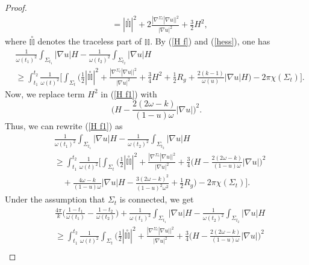 \documentclass[12pt]{article}
\theoremstyle{definition}
\theoremstyle{plain}
\numberwithin{equation}{section}
\begin{document}
\begin{proof}
\begin{equation}
\begin{aligned}
&=|\overset{\circ}{\mathbb{II}}|^{2}+2\frac{|\nabla^{\Sigma_{t}}|\nabla u||^{2}}{|\nabla u|^{2}}+\frac{3}{2}H^{2},
\end{aligned}
\end{equation}
where $ \overset{\circ}{\mathbb{II}} $ denotes the traceless part of $ \mathbb{II} $.
By (\ref{H f}) and (\ref{hess}), one has
\begin{equation}\label{H f1}
\begin{aligned}
&\frac{1}{\omega(t_{1})^{2}}\int_{\Sigma_{t_{1}}}|\nabla u|H-\frac{1}{\omega(t_{2})^{2}}\int_{\Sigma_{t_{2}}}|\nabla u|H\\
&\geq \int_{t_{1}}^{t_{2}}\frac{1}{\omega(t)^{2}}\Big[\int_{\Sigma_{t}}\Big(\frac{1}{2}|\overset{\circ}{\mathbb{II}}|^{2}+\frac{|\nabla^{\Sigma_{t}}|\nabla u||^{2}}{|\nabla u|^{2}}+\frac{3}{4}H^{2}+\frac{1}{2}R_{g}+\frac{2(k-1)}{\omega(u)}|\nabla u|H\Big)-2\pi\chi(\Sigma_{t}) \Big].
\end{aligned}
\end{equation}
Now, we replace term $ H^{2} $ in (\ref{H f1}) with 
$$
\Big(H-\frac{2(2\omega-k)}{(1-u)\omega}|\nabla u|\Big)^{2}. 
$$
Thus, we can rewrite (\ref{H f1}) as 
 \begin{equation}
 \begin{aligned}
 &\frac{1}{\omega(t_{1})^{2}}\int_{\Sigma_{t_{1}}}|\nabla u|H-\frac{1}{\omega(t_{2})^{2}}\int_{\Sigma_{t_{2}}}|\nabla u|H\\
 &\geq \int_{t_{1}}^{t_{2}}\frac{1}{\omega(t)^{2}}\Big[\int_{\Sigma_{t}}\Big(\frac{1}{2}|\overset{\circ}{\mathbb{II}}|^{2}+\frac{|\nabla^{\Sigma_{t}}|\nabla u||^{2}}{|\nabla u|^{2}}+\frac{3}{4}\Big(H-\frac{2(2\omega-k)}{(1-u)\omega}|\nabla u|\Big)^{2}\\
 &\,\,\,\,\,\,+\frac{4\omega-k}{(1-u)\omega}|\nabla u|H-\frac{3(2\omega-k)^{2}}{(1-u)^{2}\omega^{2}}
 +\frac{1}{2}R_{g}\Big)-2\pi\chi(\Sigma_{t}) \Big].
 \end{aligned}
\end{equation}
Under the assumption that $ \Sigma_{t} $ is connected, we get
\begin{equation}\label{H f2}
\begin{aligned}
&\frac{4\pi}{k}\Big(\frac{1-t_{1}}{\omega(t_{1})}-\frac{1-t_{2}}{\omega(t_{2})}\Big)+\frac{1}{\omega(t_{1})^{2}}\int_{\Sigma_{t_{1}}}|\nabla u|H-\frac{1}{\omega(t_{2})^{2}}\int_{\Sigma_{t_{2}}}|\nabla u|H\\
&\geq \int_{t_{1}}^{t_{2}}\frac{1}{\omega(t)^{2}}\int_{\Sigma_{t}}\Big(\frac{1}{2}|\overset{\circ}{\mathbb{II}}|^{2}+\frac{|\nabla^{\Sigma_{t}}|\nabla u||^{2}}{|\nabla u|^{2}}+\frac{3}{4}\Big(H-\frac{2(2\omega-k)}{(1-u)\omega}|\nabla u|\Big)^{2}\\

\end{aligned}
\end{equation}
\end{proof}
\end{document}

